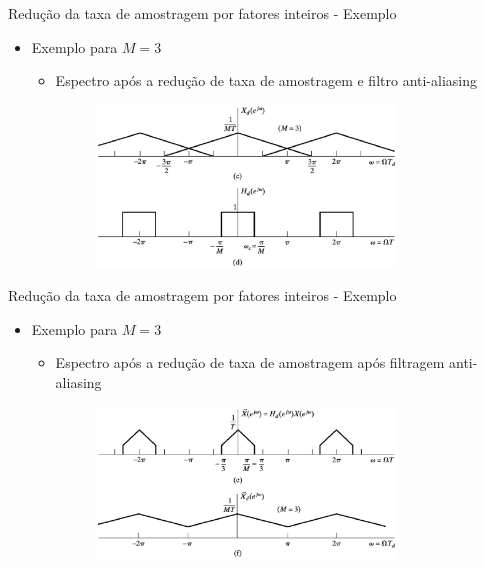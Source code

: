 \documentclass[
size=11pt,
paper=screen,
mode=present,
display=slidesnotes,
style=paintings,
nopagebreaks,
blackslide,
fleqn]{powerdot}
\begin{document}
\begin{slide}{Redução da taxa de amostragem por fatores inteiros - Exemplo}
	\begin{itemize}
		\item Exemplo para $M=3$
			\begin{itemize}
		\item Espectro após a redução de taxa de amostragem e filtro anti-aliasing
			\begin{figure}
				\centering
				\includegraphics[width=0.8\textwidth]{figs/4-21cd.eps}
		        \end{figure}
			\end{itemize}
	\end{itemize}
\end{slide}
\begin{slide}{Redução da taxa de amostragem por fatores inteiros - Exemplo}
	\begin{itemize}
		\item Exemplo para $M=3$
			\begin{itemize}
		\item Espectro após a redução de taxa de amostragem após filtragem anti-aliasing
			\begin{figure}
				\centering
				\includegraphics[width=0.8\textwidth]{figs/4-21ef.eps}
		        \end{figure}
			\end{itemize}
	\end{itemize}
\end{slide}
\end{document}
